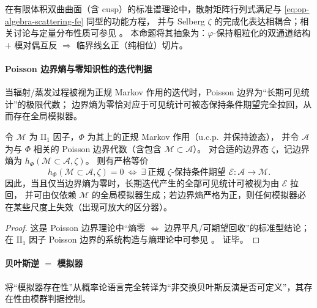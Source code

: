 \begin{remark}[与有限体积双曲曲面散射的同型性]\label{rem:op-algebra-scattering-selberg-analogy}
在有限体积双曲曲面（含 cusp）的标准谱理论中，散射矩阵行列式满足与 \eqref{eq:op-algebra-scattering-fe} 同型的功能方程，
并与 Selberg \(\zeta\) 的完成化表达相耦合；相关讨论与定量分布性质可参见 \cite{GarunkstisSimenas2017SelbergAValues}。
本命题将其抽象为：\(\varphi\)-保持粗粒化的双通道结构 \(+\) 模对偶互反 \(\Rightarrow\) 临界线幺正（纯相位）切片。
\end{remark}

\paragraph{Poisson 边界熵与零知识性的迭代判据}
当辐射/蒸发过程被视为正规 Markov 作用的迭代时，Poisson 边界为“长期可见统计”的极限代数；
边界熵为零恰对应于可见统计可被态保持条件期望完全拉回，从而存在全局模拟器。

\begin{theorem}\label{thm:op-algebra-poisson-boundary-entropy}
令 \(\mathcal{M}\) 为 \(\mathrm{II}_1\) 因子，\(\Phi\) 为其上的正规 Markov 作用（u.c.p.\ 并保持迹态），
并令 \(\mathcal{A}\) 为与 \(\Phi\) 相关的 Poisson 边界代数（含包含 \(\mathcal{M}\subset\mathcal{A}\)）。
对合适的边界态 \(\zeta\)，记边界熵为 \(h_\Phi(\mathcal{M}\subset\mathcal{A},\zeta)\)。
则有严格等价
\begin{equation}\label{eq:op-algebra-poisson-entropy-zero}
\boxed{\;
h_\Phi(\mathcal{M}\subset\mathcal{A},\zeta)=0
\ \Longleftrightarrow\
\exists\ \text{正规 }\zeta\text{-保持条件期望 }\mathcal{E}:\mathcal{A}\to\mathcal{M}.
\;}
\end{equation}
因此，当且仅当边界熵为零时，长期迭代产生的全部可见统计可被视为由 \(\mathcal{E}\) 拉回，
并可由仅依赖 \(\mathcal{M}\) 的全局模拟器生成；若边界熵严格为正，则任何模拟器必在某些尺度上失效（出现可放大的区分器）。
\end{theorem}

\begin{proof}
这是 Poisson 边界理论中“熵零 \(\Leftrightarrow\) 边界平凡/可期望回收”的标准型结论；
在 \(\mathrm{II}_1\) 因子 Poisson 边界的系统构造与熵理论中可参见 \cite{DasPeterson2022PoissonBoundariesII1}。
证毕。
\end{proof}

\paragraph{贝叶斯逆 \texorpdfstring{$=$}{=} 模拟器}
将“模拟器存在性”从概率论语言完全转译为“非交换贝叶斯反演是否可定义”，其存在性由模群判据控制。

